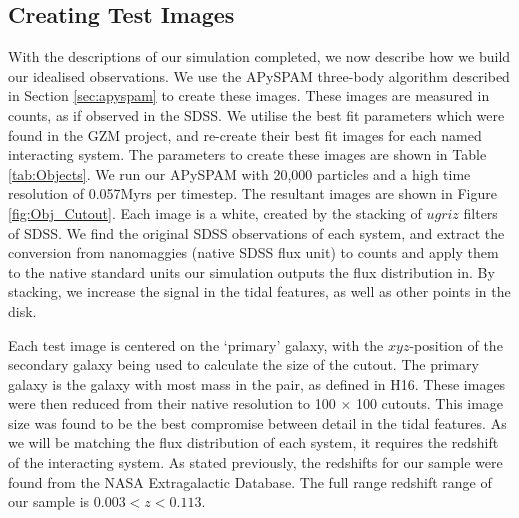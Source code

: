 \subsection{Creating Test Images}\label{sec:syn_sample}
With the descriptions of our simulation completed, we now describe how we build our idealised observations. We use the APySPAM three-body algorithm described in Section \ref{sec:apyspam} to create these images. These images are measured in counts, as if observed in the SDSS. We utilise the best fit parameters which were found in the GZM project, and re-create their best fit images for each named interacting system. The parameters to create these images are shown in Table \ref{tab:Objects}. We run our APySPAM with 20,000 particles and a high time resolution of 0.057Myrs per timestep. The resultant images are shown in Figure \ref{fig:Obj_Cutout}. Each image is a white, created by the stacking of $ugriz$ filters of SDSS. We find the original SDSS observations of each system, and extract the conversion from nanomaggies (native SDSS flux unit) to counts and apply them to the native standard units our simulation outputs the flux distribution in. By stacking, we increase the signal in the tidal features, as well as other points in the disk. 

Each test image is centered on the `primary' galaxy, with the $xyz$-position of the secondary galaxy being used to calculate the size of the cutout. The primary galaxy is the galaxy with most mass in the pair, as defined in H16. These images were then reduced from their native resolution to 100 $\times$ 100 cutouts. This image size was found to be the best compromise between detail in the tidal features. As we will be matching the flux distribution of each system, it requires the redshift of the interacting system. As stated previously, the redshifts for our sample were found from the NASA Extragalactic Database. The full range redshift range of our sample is $0.003 < z < 0.113$.

